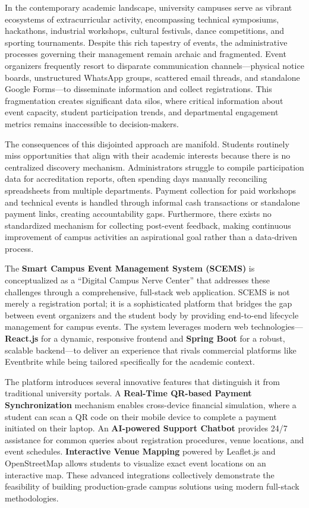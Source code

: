 \documentclass[12pt,a4paper]{report}
\begin{document}
In the contemporary academic landscape, university campuses serve as vibrant ecosystems of extracurricular activity, encompassing technical symposiums, hackathons, industrial workshops, cultural festivals, dance competitions, and sporting tournaments. Despite this rich tapestry of events, the administrative processes governing their management remain archaic and fragmented. Event organizers frequently resort to disparate communication channels---physical notice boards, unstructured WhatsApp groups, scattered email threads, and standalone Google Forms---to disseminate information and collect registrations. This fragmentation creates significant data silos, where critical information about event capacity, student participation trends, and departmental engagement metrics remains inaccessible to decision-makers.

The consequences of this disjointed approach are manifold. Students routinely miss opportunities that align with their academic interests because there is no centralized discovery mechanism. Administrators struggle to compile participation data for accreditation reports, often spending days manually reconciling spreadsheets from multiple departments. Payment collection for paid workshops and technical events is handled through informal cash transactions or standalone payment links, creating accountability gaps. Furthermore, there exists no standardized mechanism for collecting post-event feedback, making continuous improvement of campus activities an aspirational goal rather than a data-driven process.

The \textbf{Smart Campus Event Management System (SCEMS)} is conceptualized as a ``Digital Campus Nerve Center'' that addresses these challenges through a comprehensive, full-stack web application. SCEMS is not merely a registration portal; it is a sophisticated platform that bridges the gap between event organizers and the student body by providing end-to-end lifecycle management for campus events. The system leverages modern web technologies---\textbf{React.js} for a dynamic, responsive frontend and \textbf{Spring Boot} for a robust, scalable backend---to deliver an experience that rivals commercial platforms like Eventbrite while being tailored specifically for the academic context.

The platform introduces several innovative features that distinguish it from traditional university portals. A \textbf{Real-Time QR-based Payment Synchronization} mechanism enables cross-device financial simulation, where a student can scan a QR code on their mobile device to complete a payment initiated on their laptop. An \textbf{AI-powered Support Chatbot} provides 24/7 assistance for common queries about registration procedures, venue locations, and event schedules. \textbf{Interactive Venue Mapping} powered by Leaflet.js and OpenStreetMap allows students to visualize exact event locations on an interactive map. These advanced integrations collectively demonstrate the feasibility of building production-grade campus solutions using modern full-stack methodologies.
\end{document}
